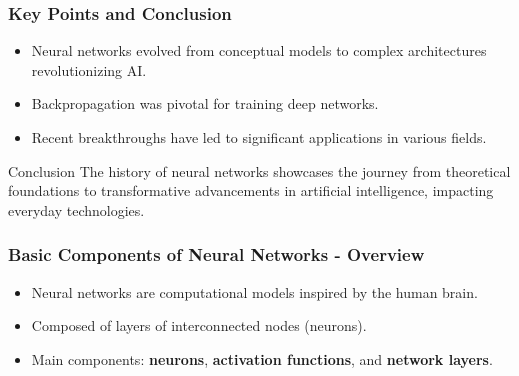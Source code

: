 \documentclass[aspectratio=169]{beamer}
\begin{document}
\begin{frame}[fragile]
    \frametitle{Key Points and Conclusion}
    \begin{itemize}
        \item Neural networks evolved from conceptual models to complex architectures revolutionizing AI.
        \item Backpropagation was pivotal for training deep networks.
        \item Recent breakthroughs have led to significant applications in various fields.
    \end{itemize}
    
    \begin{block}{Conclusion}
        The history of neural networks showcases the journey from theoretical foundations to transformative advancements in artificial intelligence, impacting everyday technologies.
    \end{block}
\end{frame}

\begin{frame}[fragile]
  \frametitle{Basic Components of Neural Networks - Overview}
  \begin{itemize}
      \item Neural networks are computational models inspired by the human brain.
      \item Composed of layers of interconnected nodes (neurons).
      \item Main components: \textbf{neurons}, \textbf{activation functions}, and \textbf{network layers}.
  \end{itemize}
\end{frame}
\end{document}
